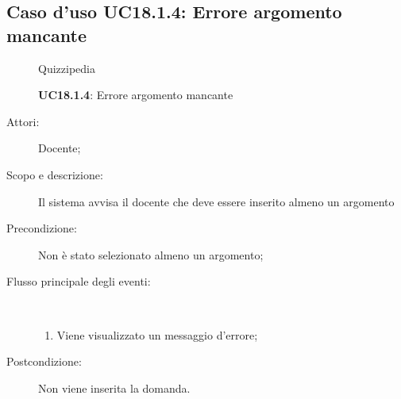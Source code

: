 \subsection{Caso d'uso UC18.1.4: Errore argomento mancante}
	\begin{figure}[H]
		\centering
		\begin{resizedtikzpicture}{\textwidth}
		\begin{umlsystem}[x=0, fill=lightgray!20]{Quizzipedia}
		\end{umlsystem}
		\end{resizedtikzpicture}
		\caption{\textbf{UC18.1.4}: Errore argomento mancante}
		\label{UC18.1.4}
	\end{figure}
\begin{description}
\item[Attori:] Docente;
\item[Scopo e descrizione:] Il sistema avvisa il docente che deve essere inserito almeno un argomento
      \item[Precondizione:] Non è stato selezionato almeno un argomento;

        \item[Flusso principale degli eventi:] \ 
 \begin{enumerate}
          \item Viene visualizzato un messaggio d'errore;

      \end{enumerate}
    \item[Postcondizione:] Non viene inserita la domanda.
  \end{description}
\hypertarget{UC18.1.5}{}
